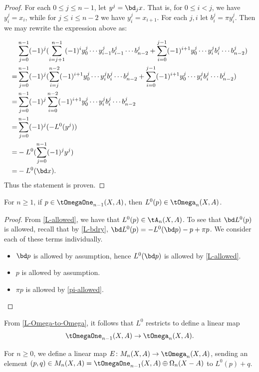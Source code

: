 \begin{proof}
For each $0 \leq j \leq n - 1$, let $y^j = \bd_j x$. That is, for $0 \leq i < j$, we have $y^j_i = x_i$, while for $j \leq i \leq n - 2$ we have $y^j_i = x_{i+1}$. For each $j, i$ let $b^j_i = \pi y^j_i$. Then we may rewrite the expression above as:

\begin{align*}
& \sum_{j = 0}^{n-1} (-1)^j (\sum_{i=j+1}^{n-1} (-1)^{i} y^j_0 \cdots y^j_{i-1} b^j_{i-1} \cdots b^j_{n-2} + \sum_{i = 0}^{j-1} (-1)^{i+1} y^j_0 \cdots y^j_i b^j_i  \cdots b^j_{n-2}) \\
= & \sum_{j = 0}^{n-1} (-1)^j (\sum_{i=j}^{n-2} (-1)^{i+1} y^j_0 \cdots y^j_{i} b^j_{i} \cdots b^j_{n-2} +  \sum_{i = 0}^{j-1} (-1)^{i+1} y^j_0 \cdots y^j_i b^j_i  \cdots b^j_{n-2}) \\
= & \sum_{j = 0}^{n-1} (-1)^j \sum_{i = 0}^{n-2} (-1)^{i+1} y^j_0 \cdots y^j_i b^j_i \cdots b^j_{n-2} \\
= & \sum_{j = 0}^{n-1} (-1)^j (-L^0(y^j)) \\
= & -L^0(\sum_{j = 0}^{n-1} (-1)^j y^j) \\
= & -L^0(\bd x).
\end{align*}
Thus the statement is proven.
\end{proof}

\begin{lemma}\label{L-Omega-to-Omega}
For $n \geq 1$, if $p \in \tOmegaOne_{n-1}(X,A)$, then $L^0(p) \in \tOmega_{n}(X,A)$.
\end{lemma}

\begin{proof}
From \cref{L-allowed}, we have that $L^0(p) \in \tA_n(X,A)$. To see that $\bd L^0(p)$ is allowed, recall that by \cref{L-bdry}, $\bd L^0(p) = -L^0(\bd p) - p + \pi p$. We consider each of these terms individually.

\begin{itemize}
    \item $\bd p$ is allowed by assumption, hence $L^0(\bd p)$ is allowed by \cref{L-allowed}.
    \item $p$ is allowed by assumption.
    \item $\pi p$ is allowed by \cref{pi-allowed}. \qedhere
\end{itemize}
\end{proof}

From \cref{L-Omega-to-Omega}, it follows that $L^0$ restricts to define a linear map \[\tOmegaOne_{n-1}(X,A) \to \tOmega_n(X,A).\]

\begin{defi}\label{iso-def}
For $n \geq 0$, we define a linear map $E \colon M_n(X,A) \to \tOmega_n(X,A)$, sending an element $(p,q) \in M_n(X,A) = \tOmegaOne_{n-1}(X,A) \oplus \Omega_{n}(X-A)$ to $L^0(p) + q$.
\end{defi}

